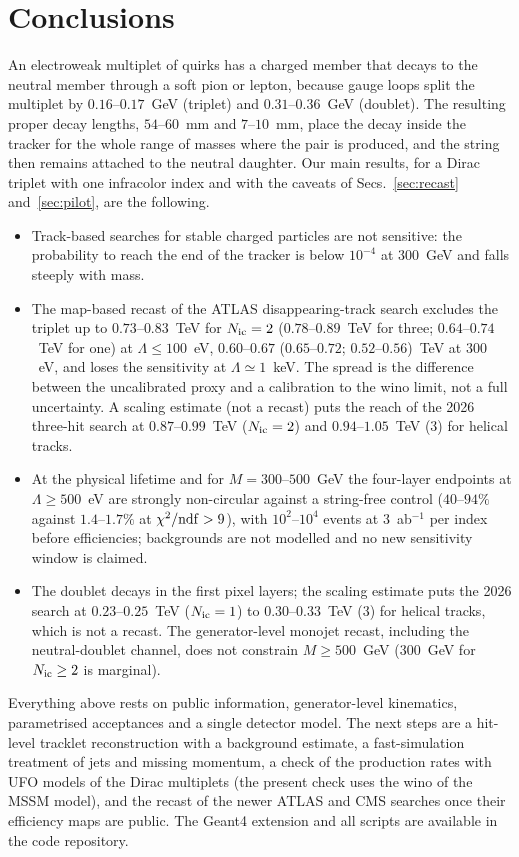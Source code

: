 \documentclass[prd,twocolumn,nofootinbib,superscriptaddress,amsmath,amssymb]{revtex4-2}
\begin{document}
\section{Conclusions}
An electroweak multiplet of quirks has a charged member that decays to the neutral member through a soft pion or lepton, because gauge loops split the multiplet by $0.16$--$0.17$~GeV (triplet) and $0.31$--$0.36$~GeV (doublet). The resulting proper decay lengths, $54$--$60$~mm and $7$--$10$~mm, place the decay inside the tracker for the whole range of masses where the pair is produced, and the string then remains attached to the neutral daughter. Our main results, for a Dirac triplet with one infracolor index and with the caveats of Secs.~\ref{sec:recast} and~\ref{sec:pilot}, are the following.
\begin{itemize}
\item Track-based searches for stable charged particles are not sensitive: the probability to reach the end of the tracker is below $10^{-4}$ at $300$~GeV and falls steeply with mass.
\item The map-based recast of the ATLAS disappearing-track search excludes the triplet up to $0.73$--$0.83$~TeV for $N_{\rm ic}=2$ ($0.78$--$0.89$~TeV for three; $0.64$--$0.74$~TeV for one) at $\Lambda\le100$~eV, $0.60$--$0.67$ ($0.65$--$0.72$; $0.52$--$0.56$)~TeV at $300$~eV, and loses the sensitivity at $\Lambda\simeq1$~keV. The spread is the difference between the uncalibrated proxy and a calibration to the wino limit, not a full uncertainty. A scaling estimate (not a recast) puts the reach of the 2026 three-hit search at $0.87$--$0.99$~TeV ($N_{\rm ic}=2$) and $0.94$--$1.05$~TeV ($3$) for helical tracks.
\item At the physical lifetime and for $M=300$--$500$~GeV the four-layer endpoints at $\Lambda\ge500$~eV are strongly non-circular against a string-free control ($40$--$94\%$ against $1.4$--$1.7\%$ at $\chi^2/{\rm ndf}>9$), with $10^2$--$10^4$ events at $3$~ab$^{-1}$ per index before efficiencies; backgrounds are not modelled and no new sensitivity window is claimed.
\item The doublet decays in the first pixel layers; the scaling estimate puts the 2026 search at $0.23$--$0.25$~TeV ($N_{\rm ic}=1$) to $0.30$--$0.33$~TeV ($3$) for helical tracks, which is not a recast. The generator-level monojet recast, including the neutral-doublet channel, does not constrain $M\ge500$~GeV ($300$~GeV for $N_{\rm ic}\ge2$ is marginal).
\end{itemize}
Everything above rests on public information, generator-level kinematics, parametrised acceptances and a single detector model. The next steps are a hit-level tracklet reconstruction with a background estimate, a fast-simulation treatment of jets and missing momentum, a check of the production rates with UFO models of the Dirac multiplets (the present check uses the wino of the MSSM model), and the recast of the newer ATLAS and CMS searches once their efficiency maps are public. The Geant4 extension and all scripts are available in the code repository.
\end{document}
